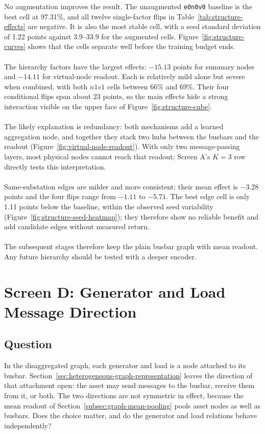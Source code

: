 No augmentation improves the result. The unaugmented \texttt{e0n0v0} baseline
is the best cell at 97.31\%, and all twelve single-factor flips in
Table~\ref{tab:structure-effects} are negative. It is also the most stable cell,
with a seed standard deviation of 1.22 points against 3.9--33.9 for the
augmented cells. Figure~\ref{fig:structure-curves} shows that the cells separate
well before the training budget ends.
\\
\\
The hierarchy factors have the largest effects: $-15.13$ points for summary
nodes and $-14.11$ for virtual-node readout. Each is relatively mild alone but
severe when combined, with both $n1v1$ cells between 66\% and 69\%. Their four
conditional flips span about 23 points, so the main effects hide a strong
interaction visible on the upper face of Figure~\ref{fig:structure-cube}.
\\
\\
The likely explanation is redundancy: both mechanisms add a learned
aggregation node, and together they stack two hubs between the busbars and the
readout (Figure~\ref{fig:virtual-node-readout}). With only two message-passing
layers, most physical nodes cannot reach that readout; Screen A's $K=3$ row
directly tests this interpretation.
\\
\\
Same-substation edges are milder and more consistent: their mean effect is
$-3.28$ points and the four flips range from $-1.11$ to $-5.71$. The best edge
cell is only 1.11 points below the baseline, within the observed seed
variability (Figure~\ref{fig:structure-seed-heatmap}); they therefore show no
reliable benefit and add candidate edges without measured return.
\\
\\
The subsequent stages therefore keep the plain busbar graph with mean readout.
Any future hierarchy should be tested with a deeper encoder.

\section{Screen D: Generator and Load Message Direction}
\label{sec:screen-message-direction}

\subsection*{Question}

In the disaggregated graph, each generator and load is a node attached to its
busbar. Section~\ref{sec:heterogeneous-graph-representation} leaves the
direction of that attachment open: the asset may send messages to the busbar,
receive them from it, or both. The two directions are not symmetric in effect,
because the mean readout of Section~\ref{subsec:graph-mean-pooling} pools
asset nodes as well as busbars. Does the choice matter, and do the generator
and load relations behave independently?

